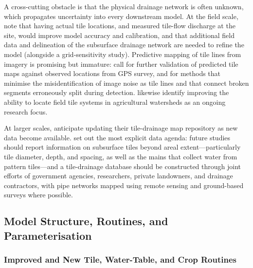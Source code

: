 A cross-cutting obstacle is that the physical drainage network is often unknown, which propagates uncertainty into every downstream model. At the field scale, \textcite{Amado2018} note that having actual tile locations, and measured tile-flow discharge at the site, would improve model accuracy and calibration, and that additional field data and delineation of the subsurface drainage network are needed to refine the model (alongside a grid-sensitivity study). Predictive mapping of tile lines from imagery is promising but immature: \textcite{Naz2009} call for further validation of predicted tile maps against observed locations from GPS survey, and for methods that minimise the misidentification of image noise as tile lines and that connect broken segments erroneously split during detection. \textcite{Schilling2019} likewise identify improving the ability to locate field tile systems in agricultural watersheds as an ongoing research focus.

At larger scales, \textcite{Valayamkunnath2020} anticipate updating their tile-drainage map repository as new data become available. \textcite{Zhou2025} set out the most explicit data agenda: future studies should report information on subsurface tiles beyond areal extent---particularly tile diameter, depth, and spacing, as well as the mains that collect water from pattern tiles---and a tile-drainage database should be constructed through joint efforts of government agencies, researchers, private landowners, and drainage contractors, with pipe networks mapped using remote sensing and ground-based surveys where possible.

\subsection{Model Structure, Routines, and Parameterisation}

\subsubsection{Improved and New Tile, Water-Table, and Crop Routines}

